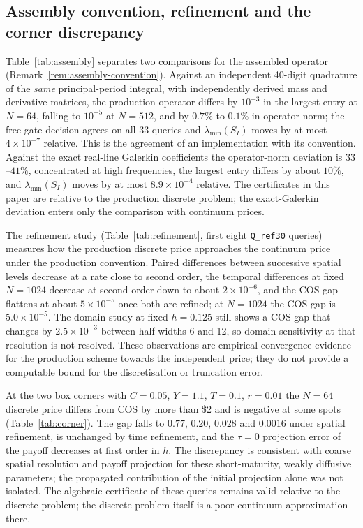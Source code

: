 \documentclass[11pt]{amsart}
\theoremstyle{remark}
\begin{document}
\subsection{Assembly convention, refinement and the corner discrepancy}
\label{ssec:refinement}

Table~\ref{tab:assembly} separates two comparisons for the assembled
operator (Remark~\ref{rem:assembly-convention}). Against an independent
40-digit quadrature of the \emph{same} principal-period integral, with
independently derived mass and derivative matrices, the production
operator differs by $10^{-3}$ in the largest entry at $N=64$, falling to
$10^{-5}$ at $N=512$, and by $0.7\%$ to $0.1\%$ in operator norm; the free
gate decision agrees on all 33 queries and $\lambda_{\min}(S_I)$ moves by at
most $4\times10^{-7}$ relative. This is the agreement of an implementation
with its convention. Against the exact real-line Galerkin coefficients the
operator-norm deviation is $33$--$41\%$, concentrated at high frequencies,
the largest entry differs by about $10\%$, and $\lambda_{\min}(S_I)$ moves by
at most $8.9\times10^{-4}$ relative. The certificates in this paper are
relative to the production discrete problem; the exact-Galerkin deviation
enters only the comparison with continuum prices.



The refinement study (Table~\ref{tab:refinement}, first eight
\texttt{Q\_ref30} queries) measures how the production discrete price
approaches the continuum price under the production convention. Paired
differences between successive spatial levels decrease at a rate close to
second order, the temporal differences at fixed $N=1024$ decrease at second
order down to about $2\times10^{-6}$, and the COS gap flattens at about
$5\times10^{-5}$ once both are refined; at $N=1024$ the COS gap is
$5.0\times10^{-5}$. The domain study at fixed $h=0.125$ still shows a COS
gap that changes by $2.5\times10^{-3}$ between half-widths 6 and 12, so
domain sensitivity at that resolution is not resolved. These observations
are empirical convergence evidence for the production scheme towards the
independent price; they do not provide a computable bound for the
discretisation or truncation error.



At the two box corners with $C=0.05$, $Y=1.1$, $T=0.1$, $r=0.01$ the $N=64$
discrete price differs from COS by more than \$2 and is negative at some
spots (Table~\ref{tab:corner}). The gap falls to $0.77$, $0.20$, $0.028$ and
$0.0016$ under spatial refinement, is unchanged by time refinement, and the
$\tau=0$ projection error of the payoff decreases at first order in $h$. The
discrepancy is consistent with coarse spatial resolution and payoff
projection for these short-maturity, weakly diffusive parameters; the
propagated contribution of the initial projection alone was not isolated.
The algebraic certificate of these queries remains valid relative to the
discrete problem; the discrete problem itself is a poor continuum
approximation there.
\end{document}
